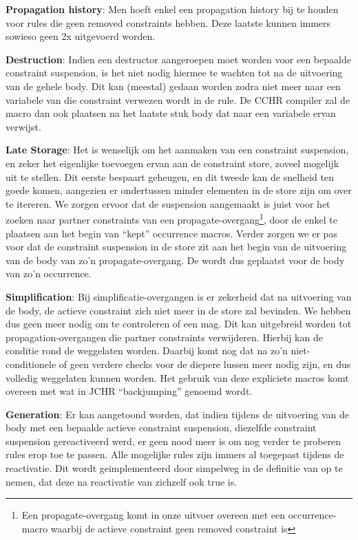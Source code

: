 {\bf Propagation history}: Men hoeft enkel een propagation history bij te houden voor rules die geen removed constraints hebben. Deze laatste kunnen immers sowieso geen 2x uitgevoerd worden.

{\bf Destruction}: Indien een destructor aangeroepen moet worden voor een bepaalde constraint suspension, is het niet nodig hiermee te wachten tot na de uitvoering van de gehele body. Dit kan (meestal) gedaan worden zodra niet meer naar een variabele van die constraint verwezen wordt in de rule. De CCHR compiler zal de  macro dan ook plaatsen na het laatste stuk body dat naar een variabele ervan verwijst.

{\bf Late Storage}: Het is wenselijk om het aanmaken van een constraint suspension, en zeker het eigenlijke toevoegen ervan aan de constraint store, zoveel mogelijk uit te stellen. Dit eerste bespaart geheugen, en dit tweede kan de snelheid ten goede komen, aangezien er ondertussen minder elementen in de store zijn om over te itereren. We zorgen ervoor dat de suspension aangemaakt is juist voor het zoeken naar partner constraints van een propagate-overgang\footnote{Een propagate-overgang komt in onze uitvoer overeen met een occurrence-macro waarbij de actieve constraint geen removed constraint is}, door de  enkel te plaatsen aan het begin van ``kept'' occurrence macros. Verder zorgen we er pas voor dat de constraint suspension in de store zit aan het begin van de uitvoering van de body van zo'n propagate-overgang. De  wordt dus geplaatst voor de body van zo'n occurrence.

{\bf Simplification}: Bij simplificatie-overgangen is er zekerheid dat na uitvoering van de body, de actieve constraint zich niet meer in de store zal bevinden. We hebben dus geen  meer nodig om te controleren of een  mag. Dit kan uitgebreid worden tot propagation-overgangen die partner constraints verwijderen. Hierbij kan de  conditie rond de  weggelaten worden. Daarbij komt nog dat na zo'n niet-conditionele  of  geen verdere checks voor de diepere lussen meer nodig zijn, en dus volledig weggelaten kunnen worden. Het gebruik van deze expliciete  macros komt overeen met wat in JCHR ``backjumping'' genoemd wordt.

{\bf Generation}: Er kan aangetoond worden, dat indien tijdens de uitvoering van de body met een bepaalde actieve constraint suspension, diezelfde constraint suspension gereactiveerd werd, er geen nood meer is om nog verder te proberen rules erop toe te passen. Alle mogelijke rules zijn immers al toegepast tijdens de reactivatie. Dit wordt geimplementeerd door simpelweg in de definitie van  op te nemen, dat deze na reactivatie van zichzelf ook true is.

